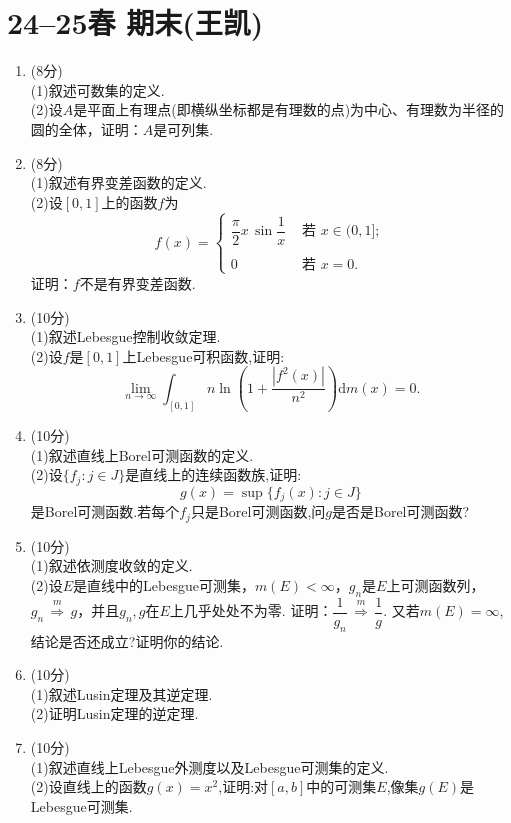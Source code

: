 \section{24--25春 期末(王凯)}
\begin{enumerate}
\item (8分)\\
(1)叙述可数集的定义.\\
(2)设$A$是平面上有理点(即横纵坐标都是有理数的点)为中心、有理数为半径的圆的全体，证明：$A$是可列集.

\item (8分)\\
(1)叙述有界变差函数的定义.\\
(2)设$[0,1]$上的函数$f$为
\[f(x)=
\begin{cases}
\dfrac{\pi}{2}x\,\sin\dfrac{1}{x} & \text{ 若 }x\in (0,1];\\ \\
0 &\text{ 若 }x=0.
\end{cases}\]
证明：$f$不是有界变差函数.

\item (10分)\\
(1)叙述Lebesgue控制收敛定理.\\
(2)设$f$是$[0,1]$上Lebesgue可积函数,证明:
\[\lim_{n\rightarrow \infty}\int_{[0,1]}n \ln\left(1+\frac{|f^{2}(x)|}{n^{2}}\right) \mathrm{d}m(x)=0.\]

\item (10分)\\
(1)叙述直线上Borel可测函数的定义.\\
(2)设$\{f_{j}:j\in J\}$是直线上的连续函数族,证明:
\[g(x)=\sup\{f_{j}(x):j \in J\}\]
是Borel可测函数.若每个$f_{j}$只是Borel可测函数,问$g$是否是Borel可测函数?

\item (10分)\\
(1)叙述依测度收敛的定义.\\
(2)设$E$是直线中的Lebesgue可测集，$m(E)<\infty$，${g_{n}}$是$E$上可测函数列，
$g_{n}\,{\overset{m}{\Longrightarrow}}\,g$，并且$g_{n},g$在$E$上几乎处处不为零.
证明：$\dfrac{1}{g_{n}}\,{\overset{m}{\Longrightarrow}}\,\dfrac{1}{g}$.
又若$m(E)=\infty$,结论是否还成立?证明你的结论.

\item (10分)\\
(1)叙述Lusin定理及其逆定理.\\
(2)证明Lusin定理的逆定理.

\item (10分)\\
(1)叙述直线上Lebesgue外测度以及Lebesgue可测集的定义.\\
(2)设直线上的函数$g(x)=x^{2}$,证明:对$[a,b]$中的可测集$E$,像集$g(E)$是Lebesgue可测集.


\end{enumerate}
